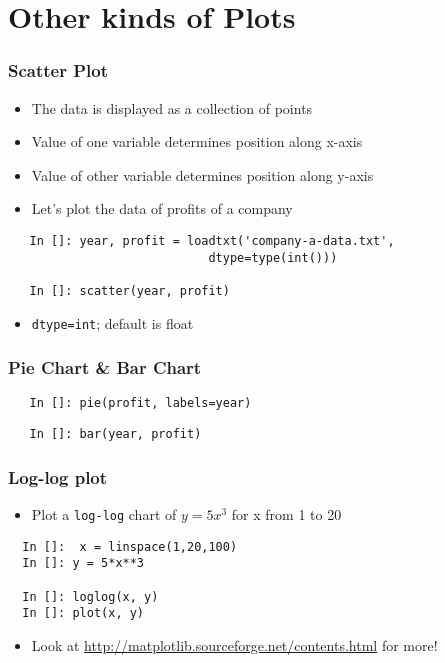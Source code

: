 \section{Other kinds of Plots}

\begin{frame}[fragile]
  \frametitle{Scatter Plot}
  \begin{itemize}
  \item The data is displayed as a collection of points
  \item Value of one variable determines position along x-axis
  \item Value of other variable determines position along y-axis
  \item Let's plot the data of profits of a company
  \end{itemize}
  \begin{lstlisting}
   In []: year, profit = loadtxt('company-a-data.txt', 
                            dtype=type(int()))

   In []: scatter(year, profit)
  \end{lstlisting}
  \begin{itemize}
  \item \alert{\texttt{dtype=int}; default is float} 
  \end{itemize}
\end{frame}

\begin{frame}[fragile]
  \frametitle{Pie Chart \& Bar Chart}
  \begin{lstlisting}
   In []: pie(profit, labels=year)
  \end{lstlisting}

  \begin{lstlisting}
   In []: bar(year, profit)
  \end{lstlisting}
\end{frame}

\begin{frame}[fragile]
  \frametitle{Log-log plot}
  \begin{itemize}
  \item Plot a \texttt{log-log} chart of $y=5x^3$ for x from 1 to 20
  \end{itemize}
  \begin{lstlisting}
  In []:  x = linspace(1,20,100)
  In []: y = 5*x**3

  In []: loglog(x, y)
  In []: plot(x, y)
  \end{lstlisting}
  \begin{itemize}
  \item Look at \url{http://matplotlib.sourceforge.net/contents.html}
    for more!
  \end{itemize}
\end{frame}


